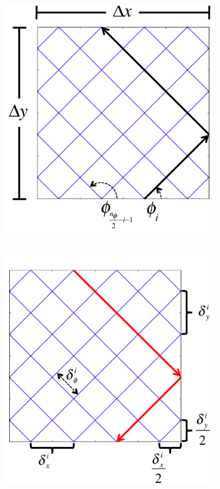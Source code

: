 \begin{figure}[h!]
	\centering
	\begin{subfigure}{0.35\textwidth}
		\centering
		\includegraphics[width=\linewidth]{figures/laydown/fwd_bwd_tracking_a.png}
		\caption{}
		\label{fig:laydown-2D-a}
	\end{subfigure}
	\begin{subfigure}{0.35\textwidth}
		\centering
		\includegraphics[width=\linewidth]{figures/laydown/fwd_bwd_tracking_b.png}

\end{subfigure}
\end{figure}

